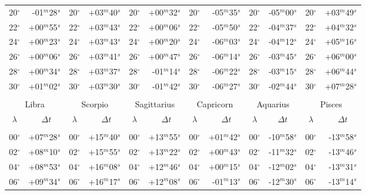 \begin{table}
{\begin{tabular}{cr|cr|cr|cr|cr|cr}
20$^\circ$ & -01$^m$28$^s$ & 20$^\circ$ & +03$^m$40$^s$ & 20$^\circ$ & +00$^m$32$^s$ & 20$^\circ$ & -05$^m$35$^s$ & 20$^\circ$ & -05$^m$00$^s$ & 20$^\circ$ & +03$^m$49$^s$\\
22$^\circ$ & +00$^m$55$^s$ & 22$^\circ$ & +03$^m$43$^s$ & 22$^\circ$ & +00$^m$06$^s$ & 22$^\circ$ & -05$^m$50$^s$ & 22$^\circ$ & -04$^m$37$^s$ & 22$^\circ$ & +04$^m$32$^s$\\
24$^\circ$ & +00$^m$23$^s$ & 24$^\circ$ & +03$^m$43$^s$ & 24$^\circ$ & +00$^m$20$^s$ & 24$^\circ$ & -06$^m$03$^s$ & 24$^\circ$ & -04$^m$12$^s$ & 24$^\circ$ & +05$^m$16$^s$\\
26$^\circ$ & +00$^m$06$^s$ & 26$^\circ$ & +03$^m$41$^s$ & 26$^\circ$ & +00$^m$47$^s$ & 26$^\circ$ & -06$^m$14$^s$ & 26$^\circ$ & -03$^m$45$^s$ & 26$^\circ$ & +06$^m$00$^s$\\
28$^\circ$ & +00$^m$34$^s$ & 28$^\circ$ & +03$^m$37$^s$ & 28$^\circ$ & -01$^m$14$^s$ & 28$^\circ$ & -06$^m$22$^s$ & 28$^\circ$ & -03$^m$15$^s$ & 28$^\circ$ & +06$^m$44$^s$\\
30$^\circ$ & +01$^m$02$^s$ & 30$^\circ$ & +03$^m$30$^s$ & 30$^\circ$ & -01$^m$42$^s$ & 30$^\circ$ & -06$^m$27$^s$ & 30$^\circ$ & -02$^m$44$^s$ & 30$^\circ$ & +07$^m$28$^s$\\
\multicolumn{12}{c}{}\\
\multicolumn{2}{c}{Libra}\vline & \multicolumn{2}{c}{Scorpio} \vline& \multicolumn{2}{c}{Sagittarius} \vline& \multicolumn{2}{c}{Capricorn}\vline &
\multicolumn{2}{c}{Aquarius}\vline & \multicolumn{2}{c}{Pisces}\\\hline
$\lambda$& $\Delta t~~~~~$& $\lambda$& $\Delta t~~~~~$& $\lambda$& $\Delta t~~~~~$& $\lambda$& $\Delta t~~~~~$& $\lambda$& $\Delta t~~~~~$& $\lambda$& $\Delta t~~~~~$\\\hline
&&&&&&&&&&&\\[-2ex]
00$^\circ$ & +07$^m$28$^s$ & 00$^\circ$ & +15$^m$40$^s$ & 00$^\circ$ & +13$^m$55$^s$ & 00$^\circ$ & +01$^m$42$^s$ & 00$^\circ$ & -10$^m$58$^s$ & 00$^\circ$ & -13$^m$58$^s$\\
02$^\circ$ & +08$^m$10$^s$ & 02$^\circ$ & +15$^m$55$^s$ & 02$^\circ$ & +13$^m$22$^s$ & 02$^\circ$ & +00$^m$43$^s$ & 02$^\circ$ & -11$^m$32$^s$ & 02$^\circ$ & -13$^m$46$^s$\\
04$^\circ$ & +08$^m$53$^s$ & 04$^\circ$ & +16$^m$08$^s$ & 04$^\circ$ & +12$^m$46$^s$ & 04$^\circ$ & +00$^m$15$^s$ & 04$^\circ$ & -12$^m$02$^s$ & 04$^\circ$ & -13$^m$31$^s$\\
06$^\circ$ & +09$^m$34$^s$ & 06$^\circ$ & +16$^m$17$^s$ & 06$^\circ$ & +12$^m$08$^s$ & 06$^\circ$ & -01$^m$13$^s$ & 06$^\circ$ & -12$^m$30$^s$ & 06$^\circ$ & -13$^m$14$^s$\\

\end{tabular}}
\end{table}
